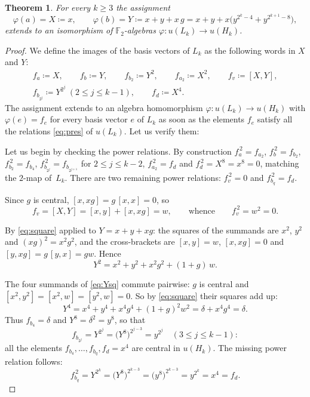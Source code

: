 \documentclass[11pt,reqno]{amsart}
\theoremstyle{plain}
\newtheorem{theorem}{Theorem}[section]
\theoremstyle{remark}
\newcommand{\Ft}{\mathbb{F}_2}
\begin{document}
\begin{theorem}\label{thm:char2}
For every $k\ge3$ the assignment
\[
\varphi(a)=X\coloneqq x,\qquad
\varphi(b)=Y\coloneqq x+y+x\,g
= x+y+x\bigl(y^{2^{k}-4}+y^{2^{k+1}-8}\bigr),
\]
extends to an isomorphism of $\Ft$-algebras
$\varphi\colon u(L_k)\to u(H_k)$.
\end{theorem}

\begin{proof}
	We define the images of the basis vectors of $L_k$ as the following words in $X$ and $Y$:
\begin{gather*}
f_a\coloneqq X,\qquad f_b\coloneqq Y,\qquad f_{b_2}\coloneqq Y^2,\qquad f_{a_2}\coloneqq X^2,\qquad
f_v\coloneqq [X,Y],\\
f_{b_{2^j}}\coloneqq Y^{2^j}\ (2\le j\le k-1),\qquad f_d\coloneqq X^4 .
\end{gather*}
The assignment extends to an
algebra homomorphism $\varphi\colon u(L_k)\to u(H_k)$ with $\varphi(e)=f_e$
for every basis vector $e$ of $L_k$ as soon as the elements $f_e$ satisfy all
the relations \eqref{eq:pres} of $u(L_k)$. Let us verify them:

Let us begin by checking the power relations. By construction $f_a^{\,2}=f_{a_2}$,
$f_b^{\,2}=f_{b_2}$, $f_{b_2}^{\,2}=f_{b_4}$,
$f_{b_{2^j}}^{\,2}=f_{b_{2^{j+1}}}$ for $2\le j\le k-2$,
$f_{a_2}^{\,2}=f_d$ and $f_d^{\,2}=X^8=x^8=0$, matching the $2$-map of~$L_k$. There are two remaining power relations: $f_v^{\,2}=0$ and
$f_{b_q}^{\,2}=f_d$.

Since $g$ is central, $[x,xg]=g\,[x,x]=0$, so
\[
f_v=[X,Y]=[x,y]+[x,xg]=w,
\qquad\text{whence}\qquad
f_v^{\,2}=w^2=0.
\]

By \eqref{eq:square} applied to $Y=x+y+xg$: the
squares of the summands are $x^2$, $y^2$ and $(xg)^2=x^2g^2$, and the
cross-brackets are $[x,y]=w$, $[x,xg]=0$ and $[y,xg]=g\,[y,x]=gw$. Hence
\begin{equation}\label{eq:Ysq}
Y^2=x^2+y^2+x^2g^2+(1+g)\,w .
\end{equation}

The four summands of \eqref{eq:Ysq} commute
pairwise: $g$ is central and $[x^2,y^2]=[x^2,w]=[y^2,w]=0$. So by \eqref{eq:square} their squares add up:
\[
Y^4=x^4+y^4+x^4g^4+(1+g)^2w^2=\delta+x^4g^4=\delta.
\]
Thus $f_{b_4}=\delta$ and
$Y^8=\delta^2=y^8$, so that
\[
f_{b_{2^j}}=Y^{2^j}=\bigl(Y^8\bigr)^{2^{j-3}}=y^{2^j}\quad(3\le j\le k-1):
\]
all the elements $f_{b_4},\dots,f_{b_q},f_d=x^4$ are central in $u(H_k)$. The
missing power relation follows:
\[
f_{b_q}^{\,2}=Y^{2^k}=\bigl(Y^{8}\bigr)^{2^{k-3}}
=\bigl(y^{8}\bigr)^{2^{k-3}}=y^{2^k}=x^4=f_d.
\]


\end{proof}
\end{document}
